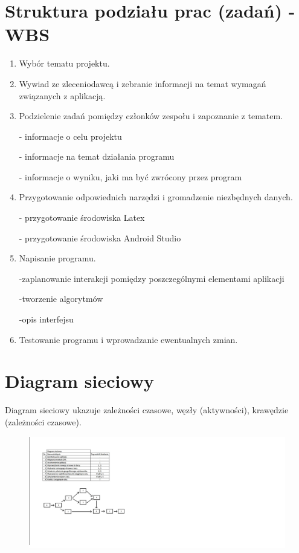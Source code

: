 \section{Struktura podziału prac (zadań) - WBS}

\begin{enumerate}
\item Wybór tematu projektu.
\item Wywiad ze zleceniodawcą i zebranie informacji na temat wymagań związanych z aplikacją.
\item Podzielenie zadań pomiędzy członków zespołu i zapoznanie z tematem.

- informacje o celu projektu

- informacje na temat działania programu

- informacje o wyniku, jaki ma być zwrócony przez program
\item Przygotowanie odpowiednich narzędzi i gromadzenie niezbędnych danych.

- przygotowanie środowiska Latex

- przygotowanie środowiska Android Studio
\item Napisanie programu.

-zaplanowanie interakcji pomiędzy poszczególnymi elementami aplikacji

-tworzenie algorytmów

-opis interfejsu

\item Testowanie programu i wprowadzanie ewentualnych zmian.
\end{enumerate}

\section{Diagram sieciowy}
Diagram sieciowy ukazuje zależności czasowe, węzły (aktywności), krawędzie (zależności czasowe).
\begin{figure}[H]
\centering
\includegraphics[scale=0.5]{czlonkowie/fig/diagram.jpg}
\end{figure}

